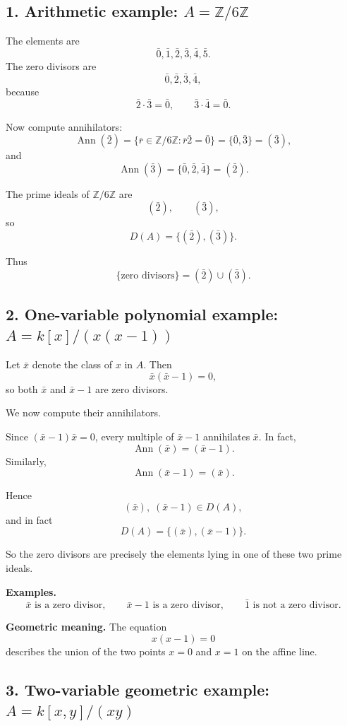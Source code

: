 \documentclass[12pt,a4paper,oneside]{report}
\DeclareMathOperator{\Ann}{Ann}
\theoremstyle{notespace}
\begin{document}
\subsection{1. Arithmetic example: \(A=\mathbb Z/6\mathbb Z\)}

The elements are
\[
\bar 0,\bar 1,\bar 2,\bar 3,\bar 4,\bar 5.
\]
The zero divisors are
\[
\bar 0,\bar 2,\bar 3,\bar 4,
\]
because
\[
\bar2\cdot \bar3=\bar0,
\qquad
\bar3\cdot \bar4=\bar0.
\]

Now compute annihilators:
\[
\Ann(\bar2)=\{\bar r\in \mathbb Z/6\mathbb Z:\bar r\bar2=\bar0\}
=\{\bar0,\bar3\}=(\bar3),
\]
and
\[
\Ann(\bar3)=\{\bar0,\bar2,\bar4\}=(\bar2).
\]

The prime ideals of \(\mathbb Z/6\mathbb Z\) are
\[
(\bar2),\qquad (\bar3),
\]
so
\[
D(A)=\{(\bar2),(\bar3)\}.
\]

Thus
\[
\{\text{zero divisors}\}=(\bar2)\cup(\bar3).
\]

\subsection{2. One-variable polynomial example: \(A=k[x]/(x(x-1))\)}

Let \(\bar x\) denote the class of \(x\) in \(A\). Then
\[
\bar x(\bar x-1)=0,
\]
so both \(\bar x\) and \(\bar x-1\) are zero divisors.

We now compute their annihilators.

Since \((\bar x-1)\bar x=0\), every multiple of \(\bar x-1\) annihilates \(\bar x\). In fact,
\[
\Ann(\bar x)=(\bar x-1).
\]
Similarly,
\[
\Ann(\bar x-1)=(\bar x).
\]

Hence
\[
(\bar x),\;(\bar x-1)\in D(A),
\]
and in fact
\[
D(A)=\{(\bar x),(\bar x-1)\}.
\]

So the zero divisors are precisely the elements lying in one of these two prime ideals.

\medskip

\noindent
\textbf{Examples.}
\[
\bar x \text{ is a zero divisor},\qquad
\bar x-1 \text{ is a zero divisor},\qquad
\bar1 \text{ is not a zero divisor}.
\]

\medskip

\noindent
\textbf{Geometric meaning.}
The equation
\[
x(x-1)=0
\]
describes the union of the two points \(x=0\) and \(x=1\) on the affine line.

\subsection{3. Two-variable geometric example: \(A=k[x,y]/(xy)\)}
\end{document}
